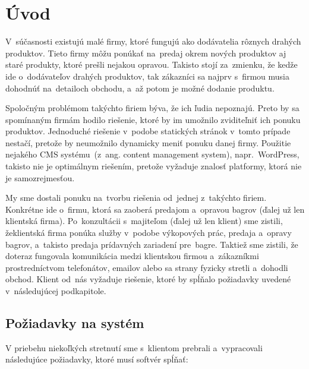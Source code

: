 \chapter{Úvod}

V~súčasnosti existujú malé firmy, ktoré fungujú ako dodávatelia rôznych drahých produktov. Tieto firmy môžu ponúkať na~predaj okrem nových produktov aj staré produkty, ktoré prešli nejakou opravou. Takisto stojí za~zmienku, že kedže ide o~dodávateľov drahých produktov, tak zákazníci sa najprv s~firmou musia dohodnúť na~detailoch obchodu, a~až potom je možné dodanie produktu.

Spoločným problémom takýchto firiem býva, že ich ľudia nepoznajú. Preto by sa spomínaným firmám hodilo riešenie, ktoré by im umožnilo zviditeľniť ich ponuku produktov. Jednoduché riešenie v~podobe statických stránok v~tomto prípade nestačí, pretože by neumožnilo dynamicky meniť ponuku danej firmy. Použitie nejakého CMS systému~(z~ang. content management system), napr.~Word\-Press, takisto nie je optimálnym riešením, pretože vyžaduje znalosť platformy, ktorá nie je samozrejmesťou.

My sme dostali ponuku na~tvorbu riešenia od~jednej z~takýchto firiem. Konkrétne ide o~firmu, ktorá sa zaoberá predajom a~opravou bagrov (ďalej už len klientská firma). Po~konzultácii s~majiteľom (ďalej už len klient) sme zistili, že\linebreak klientská firma ponúka služby v~podobe výkopových prác, predaja a~opravy ba\-grov, a~takisto predaja prídavných zariadení pre~bagre. Taktiež sme zistili, že doteraz fungovala komunikácia medzi klientskou firmou a~zákazníkmi prostredníctvom telefonátov, emailov alebo sa strany fyzicky stretli a~dohodli obchod. Klient od~nás vyžaduje riešenie, ktoré by spĺňalo požiadavky uvedené v~následujúcej podkapitole.

\section{Požiadavky na systém}
\label{poziadavky}

V priebehu niekoľkých stretnutí sme s~klientom prebrali a~vypracovali následujúce požiadavky, ktoré musí softvér spĺňať:

